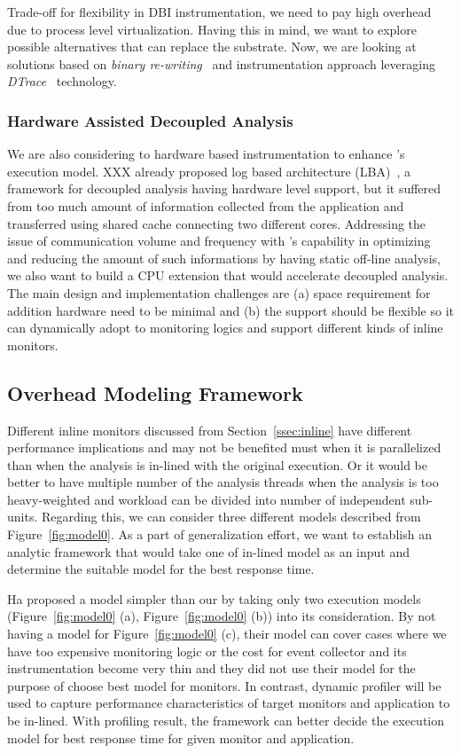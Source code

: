 Trade-off for flexibility in DBI instrumentation, we need to pay high
overhead due to process level virtualization. Having this in mind, we want to
explore possible alternatives that can replace the substrate. Now, we are
looking at solutions based on {\it binary re-writing}~\cite{cfi, rewriting} and
instrumentation approach leveraging {\it DTrace}~\cite{} technology.

\subsubsection{Hardware Assisted Decoupled Analysis} 
\label{}

We are also considering to hardware based instrumentation to enhance
\sreplica's execution model. XXX \etal already proposed log based architecture
(LBA)~\cite{lba}, a framework for decoupled analysis having hardware level
support, but it suffered from too much amount of information collected from the
application and transferred using shared cache connecting two different cores.
%
Addressing the issue of communication volume and frequency with \sreplica's
capability in optimizing and reducing the amount of such informations by having
static off-line analysis, we also want to build a CPU extension that would
accelerate decoupled analysis. 
%
The main design and implementation challenges are (a) space requirement for
addition hardware need to be minimal and (b) the support should be flexible so
it can dynamically adopt to monitoring logics and support different kinds of
inline monitors.

\subsection{Overhead Modeling Framework}

Different inline monitors discussed from Section~\ref{ssec:inline} have
different performance implications and may not be benefited must when it is
parallelized than when the analysis is in-lined with the original execution. Or
it would be better to have multiple number of the analysis threads when the
analysis is too heavy-weighted and workload can be divided into number of
independent sub-units. Regarding this, we can consider three different models
described from Figure~\ref{fig:model0}. As a part of generalization effort, we
want to establish an analytic framework that would take one of in-lined model
as an input and determine the suitable model for the best response time. 

Ha \etal\cite{xx} proposed a model simpler than our by taking only two
execution models (Figure~\ref{fig:model0} (a), Figure~\ref{fig:model0} (b))
into its consideration. By not having a model for Figure~\ref{fig:model0} (c),
their model can cover cases where we have too expensive monitoring logic or the
cost for event collector and its instrumentation become very thin and they did
not use their model for the purpose of choose best model for monitors. In
contrast, dynamic profiler will be used to capture performance characteristics
of target monitors and application to be in-lined. With profiling result, the
framework can better decide the execution model for best response time for
given monitor and application.

